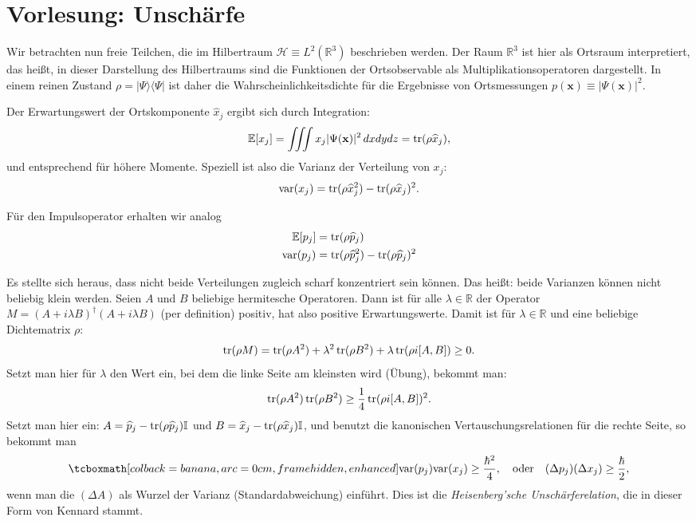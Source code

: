 \section{Vorlesung: Unschärfe}
Wir betrachten nun freie Teilchen, die im Hilbertraum $\mathcal{H}\equiv L^2(\mathbb{R}^3)$ beschrieben werden. Der Raum $\mathbb{R}^3$ ist hier als Ortsraum interpretiert, das heißt, in dieser Darstellung des Hilbertraums sind die Funktionen der Ortsobservable als Multiplikationsoperatoren dargestellt. In einem reinen Zustand $\rho = |\Psi\rangle\langle \Psi|$ ist daher die Wahrscheinlichkeitsdichte für die Ergebnisse von Ortsmessungen $p(\mathbf{x})\equiv |\Psi(\mathbf{x})|^2$.

Der Erwartungswert der Ortskomponente $\widehat{x}_j$ ergibt sich durch Integration:
\begin{equation}
	\mathbb{E}[x_j] = \iiint x_j |\Psi(\mathbf{x})|^2\, dxdydz = \operatorname{tr}(\rho \widehat{x}_j),
\end{equation}
und entsprechend für höhere Momente. Speziell ist also die Varianz der Verteilung von $x_j$:
\begin{equation}
	\text{var}(x_j) = \operatorname{tr}(\rho \widehat{x}_j^2) - \operatorname{tr}(\rho \widehat{x}_j)^2.
\end{equation}

Für den Impulsoperator erhalten wir analog
\begin{align}
	\mathbb{E}[p_j] &= \operatorname{tr}(\rho \widehat{p}_j) \\
	\text{var}(p_j) &= \operatorname{tr}(\rho \widehat{p}_j^2) - \operatorname{tr}(\rho \widehat{p}_j)^2
\end{align}

Es stellte sich heraus, dass nicht beide Verteilungen zugleich scharf konzentriert sein können. Das heißt: beide Varianzen können nicht beliebig klein werden. Seien $A$ und $B$ beliebige hermitesche Operatoren. Dann ist für alle 
$\lambda \in \mathbb{R}$ der Operator $M = (A+i\lambda B)^\dag (A+i\lambda B)$ (per definition) positiv,
hat also positive Erwartungswerte. Damit ist für $\lambda\in \mathbb{R}$ und eine beliebige
Dichtematrix $\rho$:
\begin{equation}
	\operatorname{tr}(\rho M) = \operatorname{tr}(\rho A^2)+\lambda^2\operatorname{tr}(\rho B^2) + \lambda\operatorname{tr}(\rho i[A,B])\ge 0.
\end{equation}
Setzt man hier für $\lambda$ den Wert ein, bei dem die linke Seite am kleinsten wird (Übung),
bekommt man:
\begin{equation}
	\operatorname{tr}(\rho A^2)\operatorname{tr}(\rho B^2) \ge \frac14 \operatorname{tr}(\rho i[A,B])^2.
\end{equation}
Setzt man hier ein: $A=\widehat{p}_j - \operatorname{tr}(\rho \widehat{p}_j )\mathbb{I}$ und $B=\widehat{x}_j - \operatorname{tr}(\rho \widehat{x}_j )\mathbb{I}$, und benutzt die kanonischen Vertauschungsrelationen für die rechte Seite, so bekommt man
\begin{equation}
	\eqbox{\text{var}(p_j)\text{var}(x_j) \ge \frac{\hbar^2}{4}, \quad\text{oder}\quad (\Delta p_j)(\Delta x_j) \ge \frac{\hbar}{2},}
\end{equation}
wenn man die $(\Delta A)$ als Wurzel der Varianz (Standardabweichung) einführt. Dies ist die \emph{Heisenberg'sche Unschärferelation}, die in dieser Form von Kennard stammt.

